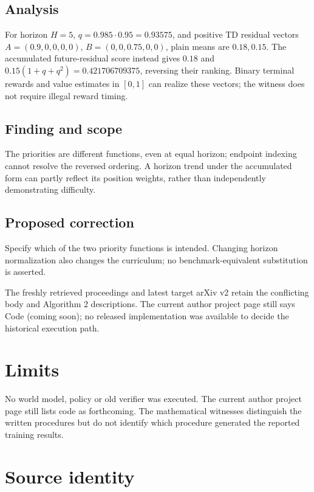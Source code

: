 \documentclass[11pt]{article}
\begin{document}
\subsection*{Analysis}

For horizon \(H=5\), \(q=0.985\cdot0.95=0.93575\), and positive TD residual vectors \(A=(0.9,0,0,0,0)\), \(B=(0,0,0.75,0,0)\), plain means are \(0.18,0.15\). The accumulated future-residual score instead gives \(0.18\) and \(0.15(1+q+q^2)=0.421706709375\), reversing their ranking. Binary terminal rewards and value estimates in \([0,1]\) can realize these vectors; the witness does not require illegal reward timing.

\subsection*{Finding and scope}

The priorities are different functions, even at equal horizon; endpoint indexing cannot resolve the reversed ordering. A horizon trend under the accumulated form can partly reflect its position weights, rather than independently demonstrating difficulty.

\subsection*{Proposed correction}

Specify which of the two priority functions is intended. Changing horizon normalization also changes the curriculum; no benchmark-equivalent substitution is asserted.

The freshly retrieved proceedings and latest target arXiv v2 retain the conflicting body and Algorithm 2 descriptions. The current author project page still says Code (coming soon); no released implementation was available to decide the historical execution path.

\section*{Limits}

No world model, policy or old verifier was executed. The current author project page still lists code as forthcoming. The mathematical witnesses distinguish the written procedures but do not identify which procedure generated the reported training results.\par

\section*{Source identity}
\end{document}
